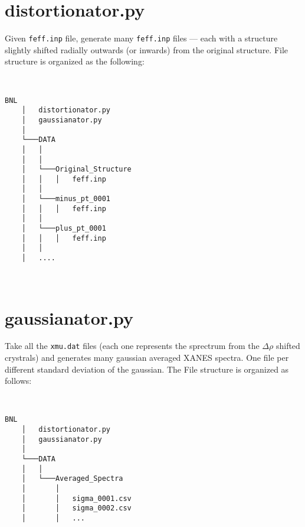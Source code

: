 

\section{distortionator.py}
Given \texttt{feff.inp} file, generate many \texttt{feff.inp} files --- each with a structure slightly shifted radially outwards (or inwards) from the original structure. File structure is organized as the following: 

\begin{minipage}{\linewidth}
~ \\
\begin{Verbatim}[samepage=true]
    BNL
    │   distortionator.py
    │   gaussianator.py
    │       
    └───DATA
    │   │       
    │   │
    │   └───Original_Structure
    │   │   │   feff.inp
    │   │       
    │   └───minus_pt_0001
    │   │   │   feff.inp
    │   │       
    │   └───plus_pt_0001
    │   │   │   feff.inp
    │   │
    │   ....        
\end{Verbatim}
~
\end{minipage}

\section{gaussianator.py}
Take all the \texttt{xmu.dat} files (each one represents the sprectrum from the $\Delta \rho$ shifted crystrals) and generates many gaussian averaged XANES spectra. One file per different standard deviation of the gaussian. The File structure is organized as follows: 

\begin{minipage}{\linewidth}
~ \\
\begin{Verbatim}[samepage=true]
    BNL
    │   distortionator.py
    │   gaussianator.py   
    │
    └───DATA
    │   │ 
    │   └───Averaged_Spectra
    │       │       
    │       │   sigma_0001.csv
    │       │   sigma_0002.csv
    │       │   ...      
\end{Verbatim}
~
\end{minipage}
    

